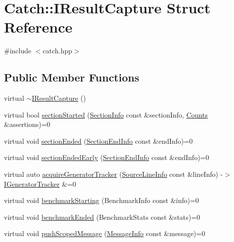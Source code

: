 \hypertarget{struct_catch_1_1_i_result_capture}{}\section{Catch\+:\+:I\+Result\+Capture Struct Reference}
\label{struct_catch_1_1_i_result_capture}


{\ttfamily \#include $<$catch.\+hpp$>$}

\subsection*{Public Member Functions}
\begin{DoxyCompactItemize}
\item 
virtual \mbox{\hyperlink{struct_catch_1_1_i_result_capture_a3bd16719d6772b7470887fc36c6d0808}{$\sim$\+I\+Result\+Capture}} ()
\item 
virtual bool \mbox{\hyperlink{struct_catch_1_1_i_result_capture_a5b76ed52badcb64cf374202e12b81a03}{section\+Started}} (\mbox{\hyperlink{struct_catch_1_1_section_info}{Section\+Info}} const \&section\+Info, \mbox{\hyperlink{struct_catch_1_1_counts}{Counts}} \&assertions)=0
\item 
virtual void \mbox{\hyperlink{struct_catch_1_1_i_result_capture_a4e152bc43dc0933684e31fa67a58195d}{section\+Ended}} (\mbox{\hyperlink{struct_catch_1_1_section_end_info}{Section\+End\+Info}} const \&end\+Info)=0
\item 
virtual void \mbox{\hyperlink{struct_catch_1_1_i_result_capture_afcc71eef8ca821ae132cced4a2be6988}{section\+Ended\+Early}} (\mbox{\hyperlink{struct_catch_1_1_section_end_info}{Section\+End\+Info}} const \&end\+Info)=0
\item 
virtual auto \mbox{\hyperlink{struct_catch_1_1_i_result_capture_ab020d111e29ad1cabe1227dcfda712ef}{acquire\+Generator\+Tracker}} (\mbox{\hyperlink{struct_catch_1_1_source_line_info}{Source\+Line\+Info}} const \&line\+Info) -\/$>$ \mbox{\hyperlink{struct_catch_1_1_i_generator_tracker}{I\+Generator\+Tracker}} \&=0
\item 
virtual void \mbox{\hyperlink{struct_catch_1_1_i_result_capture_a264ae12330c74b2daae41715a30d51bf}{benchmark\+Starting}} (Benchmark\+Info const \&info)=0
\item 
virtual void \mbox{\hyperlink{struct_catch_1_1_i_result_capture_a6e5e64f9d94211a888249012ab6cc7fb}{benchmark\+Ended}} (Benchmark\+Stats const \&stats)=0
\item 
virtual void \mbox{\hyperlink{struct_catch_1_1_i_result_capture_a91d154c1e087e383dcde5aad95cb6a05}{push\+Scoped\+Message}} (\mbox{\hyperlink{struct_catch_1_1_message_info}{Message\+Info}} const \&message)=0

\end{DoxyCompactItemize}

